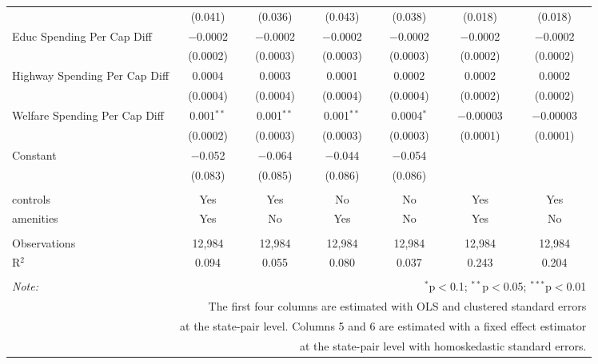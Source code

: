 \begin{table}[!htbp]
\begin{tabular}{@{\extracolsep{5pt}}lcccccc}
  & (0.041) & (0.036) & (0.043) & (0.038) & (0.018) & (0.018) \\ 
  Educ Spending Per Cap Diff & $-$0.0002 & $-$0.0002 & $-$0.0002 & $-$0.0002 & $-$0.0002 & $-$0.0002 \\ 
  & (0.0002) & (0.0003) & (0.0003) & (0.0003) & (0.0002) & (0.0002) \\ 
  Highway Spending Per Cap Diff & 0.0004 & 0.0003 & 0.0001 & 0.0002 & 0.0002 & 0.0002 \\ 
  & (0.0004) & (0.0004) & (0.0004) & (0.0004) & (0.0002) & (0.0002) \\ 
  Welfare Spending Per Cap Diff & 0.001$^{**}$ & 0.001$^{**}$ & 0.001$^{**}$ & 0.0004$^{*}$ & $-$0.00003 & $-$0.00003 \\ 
  & (0.0002) & (0.0003) & (0.0003) & (0.0003) & (0.0001) & (0.0001) \\ 
  Constant & $-$0.052 & $-$0.064 & $-$0.044 & $-$0.054 &  &  \\ 
  & (0.083) & (0.085) & (0.086) & (0.086) &  &  \\ 
 \hline \\[-1.8ex] 
controls & Yes & Yes & No & No & Yes & Yes \\ 
amenities & Yes & No & Yes & No & Yes & No \\ 
\hline \\[-1.8ex] 
Observations & 12,984 & 12,984 & 12,984 & 12,984 & 12,984 & 12,984 \\ 
R$^{2}$ & 0.094 & 0.055 & 0.080 & 0.037 & 0.243 & 0.204 \\ 
\hline 
\hline \\[-1.8ex] 
\textit{Note:}  & \multicolumn{6}{r}{$^{*}$p$<$0.1; $^{**}$p$<$0.05; $^{***}$p$<$0.01} \\ 
 & \multicolumn{6}{r}{The first four columns are estimated with OLS and clustered standard errors} \\ 
 & \multicolumn{6}{r}{at the state-pair level. Columns 5 and 6 are estimated with a fixed effect estimator} \\ 
 & \multicolumn{6}{r}{at the state-pair level with homoskedastic standard errors.} \\ 
\end{tabular} 
\end{table} 
